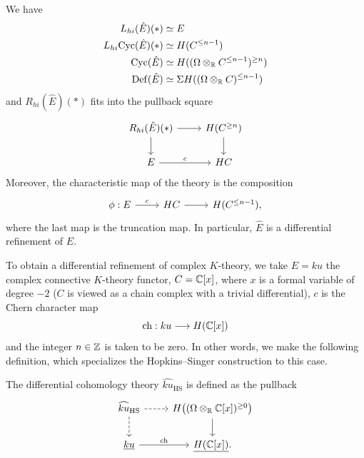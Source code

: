 \documentclass[10pt]{amsart}
\begin{document}
\begin{theorem}\cite[Thm.~4.7]{bunkenikolausvoelkl2016diffcoh}
\label{DiffRefinementThm}
We have
\begin{align*}
	L_{hi}(\hat{E})(*)
	&\simeq E
	\\
	L_{hi}\mathrm{Cyc}(\hat{E})(*) &\simeq H(C^{\leq n-1})
	\\
	\mathrm{Cyc}(\hat{E}) 
	&\simeq H((\Omega \otimes_{\mathbb{R}} C^{\leq n-1})^{\geq n})
	\\
	\mathrm{Def}(\hat{E})
	&\simeq \Sigma H((\Omega \otimes_{\mathbb{R}} C)^{\leq n-1})
\end{align*}
and $R_{hi}(\hat{E})(*)$ fits into the pullback square
\[
\begin{tikzcd}
	R_{hi}(\hat{E})(*)
	\ar[r]
	\ar[d] &
	H(C^{\geq n})
	\ar[d]
	\\
	E \ar[r, "c"] & HC
\end{tikzcd}
\]
Moreover, the characteristic map of the theory is the composition
\[
\begin{tikzcd}
\phi : E \ar[r, "c"] & HC \ar[r] & H(C^{\leq n-1}),
\end{tikzcd}
\]
where the last map is the truncation map. In particular, $\hat{E}$ is a differential refinement of $E$. 
\end{theorem}

To obtain a differential refinement of complex $K$-theory, we take $E = ku$ the complex connective $K$-theory functor, $C = \mathbb{C}[x]$, where $x$ is a formal variable of degree $-2$ ($C$ is viewed as a chain complex with a trivial differential), $c$ is the Chern character map
\[
\mathrm{ch} : ku \longrightarrow H(\mathbb{C}[x])
\]
and the integer $n \in \mathbb{Z}$ is taken to be zero. In other words, we make the following definition, which specializes the Hopkins--Singer construction to this case.

\begin{definition}
The differential cohomology theory 	$\widehat{ku}_{\mathrm{HS}}$ is defined as the pullback
\[
\begin{tikzcd}
\widehat{ku}_{\mathrm{HS}}
\ar[r, dashed] 
\ar[d, dashed]
&
H\bigl((\Omega \otimes_\bR \bC[x])^{\geq 0}\bigr)
\ar[d]
\\
\underline{ku} \ar[r, "\ch"] 
& 
\underline{H(\bC[x])}.
\end{tikzcd}
\]
\end{definition}
\end{document}
